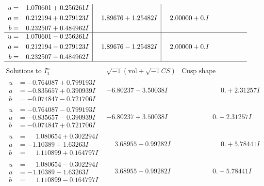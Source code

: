 \documentclass[1p]{elsarticle_modified}
\theoremstyle{definition}
\newcommand{\I}{\sqrt{-1}}
\begin{document}
$$\begin{array}{c|c|c}
\begin{aligned}
u &= \phantom{-}1.070601 + 0.256261 I \\
a &= \phantom{-}0.212194 + 0.279123 I \\
b &= \phantom{-}0.232507 + 0.484962 I\end{aligned}
 & \phantom{-}1.89676 + 1.25482 I & \phantom{-}2.00000 + 0. I\phantom{ +0.000000I} \\ \hline\begin{aligned}
u &= \phantom{-}1.070601 - 0.256261 I \\
a &= \phantom{-}0.212194 - 0.279123 I \\
b &= \phantom{-}0.232507 - 0.484962 I\end{aligned}
 & \phantom{-}1.89676 - 1.25482 I & \phantom{-}2.00000 + 0. I\phantom{ +0.000000I}\\
 \hline 
 \end{array}$$\newpage$$\begin{array}{c|c|c}  
\text{Solutions to }I^u_{1}& \I (\text{vol} + \sqrt{-1}CS) & \text{Cusp shape}\\
 \hline 
\begin{aligned}
u &= -0.764087 + 0.799193 I \\
a &= -0.835657 + 0.390939 I \\
b &= -0.074847 - 0.721706 I\end{aligned}
 & -6.80237 - 3.50038 I & \phantom{-0.000000 -}0. + 2.31257 I \\ \hline\begin{aligned}
u &= -0.764087 - 0.799193 I \\
a &= -0.835657 - 0.390939 I \\
b &= -0.074847 + 0.721706 I\end{aligned}
 & -6.80237 + 3.50038 I & \phantom{-0.000000 } 0. - 2.31257 I \\ \hline\begin{aligned}
u &= \phantom{-}1.080654 + 0.302294 I \\
a &= -1.10389 + 1.63263 I \\
b &= \phantom{-}1.110899 + 0.164797 I\end{aligned}
 & \phantom{-}3.68955 + 0.99282 I & \phantom{-0.000000 -}0. + 5.78441 I \\ \hline\begin{aligned}
u &= \phantom{-}1.080654 - 0.302294 I \\
a &= -1.10389 - 1.63263 I \\
b &= \phantom{-}1.110899 - 0.164797 I\end{aligned}
 & \phantom{-}3.68955 - 0.99282 I & \phantom{-0.000000 } 0. - 5.78441 I \\ \hline\begin{aligned}

\end{aligned}
\end{array}$$
\end{document}
